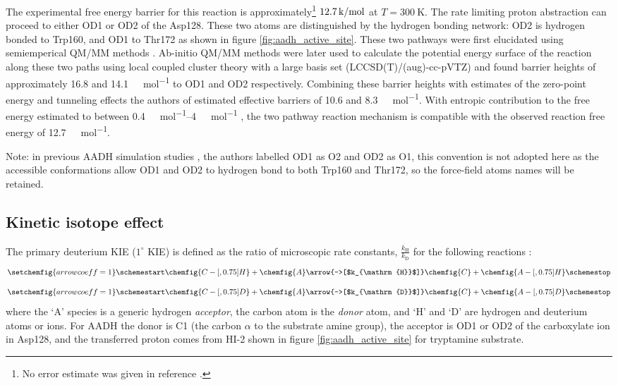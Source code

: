 The experimental free energy barrier for this reaction is approximately\footnote{No error estimate was given in reference \cite{masgrauAtomicDescriptionEnzyme2006}.} $ \SI{12.7}{\kilo\cal\per\mol}$ at $T=\SI{300}{\kelvin}$. The rate limiting proton abstraction can proceed to either OD1 or OD2 of the Asp128. These two atoms are distinguished by the hydrogen bonding network: OD2 is hydrogen bonded to Trp160, and OD1 to Thr172 as shown in figure \ref{fig:aadh_active_site}. These two pathways were first elucidated using semiemperical QM/MM methods \cite{masgrauAtomicDescriptionEnzyme2006}. Ab-initio QM/MM methods were later used to calculate the potential energy surface of the reaction along these two paths using local coupled cluster theory with a large basis set (LCCSD(T)/(aug)-cc-pVTZ)\cite{ranaghanInitioQMMM2017} and found barrier heights of approximately \num{16.8} and \SI{14.1}{\kilo\cal\per\mol} to OD1 and OD2 respectively.  Combining these barrier heights with estimates of the zero-point energy and tunneling effects the authors of \cite{ranaghanInitioQMMM2017} estimated effective barriers of \num{10.6} and \SI{8.3}{\kilo\cal\per\mol}. With entropic contribution to the free energy estimated to between \SIrange{0.4}{4}{\kilo\cal\per\mol} \cite{claeyssensHighAccuracyComputationReaction2006, kazemiEnzymeCatalysisEntropy2016}, the two pathway reaction mechanism is compatible with the observed reaction free energy of \SI{12.7}{\kilo\cal\per\mol}. 

Note: in previous AADH simulation studies \cite{masgrauAtomicDescriptionEnzyme2006,masgrauTunnelingClassicalPaths2007,ranaghanInitioQMMM2017}, the authors labelled OD1 as O2 and OD2 as O1, this convention is not adopted here as the accessible conformations allow OD1 and OD2 to hydrogen bond to both Trp160 and Thr172, so the force-field atoms names will be retained. 


\subsection{Kinetic isotope effect}
The primary deuterium KIE ($\mathrm{1}^{\circ}$ KIE) is defined as the ratio of microscopic rate constants, $\frac{k_{\mathrm{H}}}{k_{\mathrm{D}}}$ for the following reactions \cite{bisswanger2017enzyme}: 
\begin{equation}
\setchemfig{arrow coeff=1}
\schemestart
    \chemfig{C-[,0.75]H} + \chemfig{A}
    \arrow{->[$k_{\mathrm{H}}$]}
    \chemfig{C} + \chemfig{A-[,0.75]H}
\schemestop
\end{equation}
\begin{equation}
\setchemfig{arrow coeff=1}
\schemestart
    \chemfig{C-[,0.75]D} + \chemfig{A}
    \arrow{->[$k_{\mathrm{D}}$]}
    \chemfig{C} + \chemfig{A-[,0.75]D}
\schemestop
\end{equation}
where the `A' species is a generic hydrogen \emph{acceptor}, the carbon atom is the \emph{donor} atom, and `H' and `D' are hydrogen and deuterium atoms or ions. For AADH the donor is C1 (the carbon $\alpha$ to the substrate amine group), the acceptor is OD1 or OD2 of the carboxylate ion in Asp128, and the transferred proton comes from HI-2 shown in figure \ref{fig:aadh_active_site} for tryptamine substrate. 

